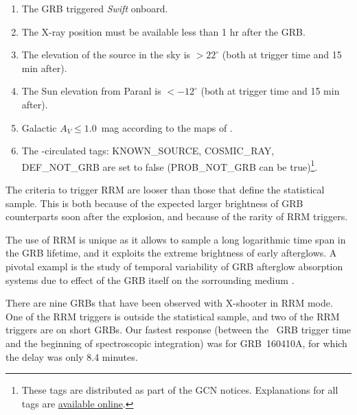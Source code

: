 \documentclass[longauth]{aa}    %
\begin{document}
\begin{enumerate}
	\item The GRB triggered \textit{Swift} onboard.
	\item The X-ray position must be available less than 1 hr after the GRB.
	\item The elevation of the source in the sky is $> 22^\circ$ (both at trigger time and 15 min after).
	\item The Sun elevation from Paranl is $< -12^\circ$ (both at trigger time and 15 min after).
	\item Galactic $A_V \leq 1.0$~mag according to the maps of \citet{Schlegel1998}.
	\item The \swift-circulated tags: KNOWN\_SOURCE, COSMIC\_RAY, DEF\_NOT\_GRB are set to false (PROB\_NOT\_GRB can be true)\footnote{These tags are distributed as part of the GCN notices. Explanations for all tags are \href{https://gcn.gsfc.nasa.gov/sock_pkt_def_doc.html}{available online}.}.
\end{enumerate}

The criteria to trigger RRM are looser than those that define the statistical
sample. This is both because of the expected larger brightness of GRB
counterparts soon after the explosion, and because of the rarity of RRM
triggers.

The use of RRM is unique as it allows to sample a long logarithmic time span in
the GRB lifetime, and it exploits the extreme brightness of early afterglows. A
pivotal exampl is the study of temporal variability of GRB afterglow absorption
systems due to effect of the GRB itself on the sorrounding medium \citep[e.g.,
see][]{Dessauges-Zavadsky2006, Vreeswijk2007, DElia2009, Vreeswijk2013}.

There are nine GRBs that have been observed with X-shooter in RRM mode. One of
the RRM triggers is outside the statistical sample, and two of the RRM triggers
are on short GRBs. Our fastest response (between the \swift~GRB trigger time and
the beginning of spectroscopic integration) was for GRB~160410A, for which the
delay was only 8.4 minutes.
\end{document}
